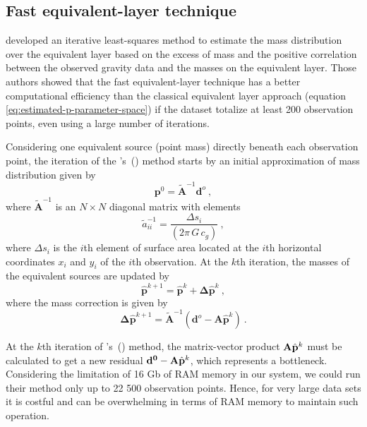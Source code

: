 \documentclass[manuscript,revised]{geophysics}
\begin{document}
\subsection{Fast equivalent-layer technique}
\citet{siqueira-etal2017} developed an iterative least-squares method to estimate the mass 
distribution over the equivalent layer based on the excess of mass and the positive correlation 
between the observed gravity data and the masses on the equivalent layer. Those authors showed 
that the fast equivalent-layer technique has a better computational efficiency than the 
classical equivalent layer approach (equation \ref{eq:estimated-p-parameter-space}) if the 
dataset totalize at least 200 observation points, even using a large number of iterations.

Considering one equivalent source (point mass) directly beneath each observation point, 
the iteration of the \citeauthor{siqueira-etal2017}'s~(\citeyear{siqueira-etal2017}) method 
starts by an initial approximation of mass distribution given by
\begin{equation}
\mathbf{p}^0 = \tilde{\mathbf{A}}^{-1} \mathbf{d}^{o} \: ,
\label{eq:p0_fast_eqlayer}
\end{equation}
where $\tilde{\mathbf{A}}^{-1}$ is an $N \times N$ diagonal matrix with elements
\begin{equation}
\tilde{a}_{ii}^{-1} = \frac{\Delta s_i}{(2 \pi \, G \, c_g)} \: ,
\label{eq:aii_tilde_inv_fast_eqlayer}
\end{equation}
where $\Delta s_i$ is the $i$th element of surface area located at the $i$th horizontal 
coordinates $x_i$ and $y_i$ of the $i$th observation.
At the $k$th iteration, the masses of the equivalent sources are updated by
\begin{equation}
\hat{\mathbf{p}}^{k+1} = \hat{\mathbf{p}}^{k} + \mathbf{\Delta} \hat{\mathbf{p}}^{k} \: ,
\label{eq:p_k+1_fast_eqlayer}
\end{equation}
where the mass correction is given by
\begin{equation}
\mathbf{\Delta} \hat{\mathbf{p}}^{k+1} = \tilde{\mathbf{A}}^{-1} (\mathbf{d}^{o} - \mathbf{A} \hat{\mathbf{p}}^{k}) \: .
\label{eq:delta_p_k_fast_eqlayer}
\end{equation}

At the $k$th iteration of \citeauthor{siqueira-etal2017}'s~(\citeyear{siqueira-etal2017}) method, 
the matrix-vector product 
$\tensor{A} \hat{\mathbf{p}}^{k}$ must be calculated to get a new residual 
$\mathbf{d^0} - \tensor{A} \hat{\mathbf{p}}^{k}$, which represents a bottleneck. 
Considering the limitation of 16 Gb of RAM 
memory in our system, we could run their method only up to 22 500 observation points. 
Hence, for very large data sets it is costful and can be overwhelming in terms of RAM 
memory to maintain such operation.
\end{document}
